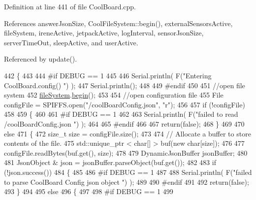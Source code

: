 Definition at line 441 of file Cool\+Board.\+cpp.



References answer\+Json\+Size, Cool\+File\+System\+::begin(), external\+Sensors\+Active, file\+System, irene\+Active, jetpack\+Active, log\+Interval, sensor\+Json\+Size, server\+Time\+Out, sleep\+Active, and user\+Active.



Referenced by update().


\begin{DoxyCode}
442 \{
443 
444 \textcolor{preprocessor}{#if DEBUG == 1}
445 
446     Serial.println( F(\textcolor{stringliteral}{"Entering CoolBoard.config() "}) );
447     Serial.println();
448 
449 \textcolor{preprocessor}{#endif}
450 
451     \textcolor{comment}{//open file system}
452     \hyperlink{classCoolBoard_a42c2586fbb13ff7f06538e9284e8538d}{fileSystem}.\hyperlink{classCoolFileSystem_a6ba6f666ed4c530174f8569d2c636748}{begin}();
453     
454     \textcolor{comment}{//open configuration file}
455     File configFile = SPIFFS.open(\textcolor{stringliteral}{"/coolBoardConfig.json"}, \textcolor{stringliteral}{"r"});
456     
457     \textcolor{keywordflow}{if} (!configFile)
458 
459     \{
460     
461 \textcolor{preprocessor}{    #if DEBUG == 1}
462 
463         Serial.println( F(\textcolor{stringliteral}{"failed to read /coolBoardConfig.json  "}) );
464 
465 \textcolor{preprocessor}{    #endif}
466     
467         \textcolor{keywordflow}{return}(\textcolor{keyword}{false});
468     \}
469 
470     \textcolor{keywordflow}{else}
471     \{
472         \textcolor{keywordtype}{size\_t} size = configFile.size();
473 
474         \textcolor{comment}{// Allocate a buffer to store contents of the file.}
475         std::unique\_ptr < char[] > buf(\textcolor{keyword}{new} \textcolor{keywordtype}{char}[size]);
476 
477         configFile.readBytes(buf.get(), size);
478 
479         DynamicJsonBuffer jsonBuffer;
480 
481         JsonObject & json = jsonBuffer.parseObject(buf.get());
482 
483         \textcolor{keywordflow}{if} (!json.success())
484         \{
485         
486 \textcolor{preprocessor}{        #if DEBUG == 1}
487 
488             Serial.println( F(\textcolor{stringliteral}{"failed to parse CoolBoard Config json object "}) );
489     
490 \textcolor{preprocessor}{        #endif}
491 
492             \textcolor{keywordflow}{return}(\textcolor{keyword}{false});
493         \}
494 
495         \textcolor{keywordflow}{else}
496         \{   
497         
498 \textcolor{preprocessor}{        #if DEBUG == 1}
499             

\end{DoxyCode}
